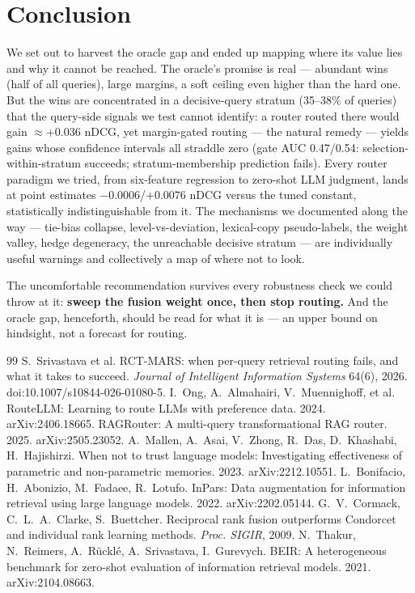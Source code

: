 \documentclass[11pt]{article}
\begin{document}
\section{Conclusion}
We set out to harvest the oracle gap and ended up mapping where its value lies and why it cannot be reached. The oracle's promise is real --- abundant wins (half of all queries), large margins, a soft ceiling even higher than the hard one. But the wins are concentrated in a decisive-query stratum (35--38\% of queries) that the query-side signals we test cannot identify: a router routed there would gain ${\approx}{+}0.036$ nDCG, yet margin-gated routing --- the natural remedy --- yields gains whose confidence intervals all straddle zero (gate AUC 0.47/0.54: selection-within-stratum succeeds; stratum-membership prediction fails). Every router paradigm we tried, from six-feature regression to zero-shot LLM judgment, lands at point estimates $-0.0006$/$+0.0076$ nDCG versus the tuned constant, statistically indistinguishable from it. The mechanisms we documented along the way --- tie-bias collapse, level-vs-deviation, lexical-copy pseudo-labels, the weight valley, hedge degeneracy, the unreachable decisive stratum --- are individually useful warnings and collectively a map of where not to look.

The uncomfortable recommendation survives every robustness check we could throw at it: \textbf{sweep the fusion weight once, then stop routing.} And the oracle gap, henceforth, should be read for what it is --- an upper bound on hindsight, not a forecast for routing.

\begin{thebibliography}{99}
 S.~Srivastava et al. RCT-MARS: when per-query retrieval routing fails, and what it takes to succeed. \emph{Journal of Intelligent Information Systems} 64(6), 2026. doi:10.1007/s10844-026-01080-5.
 I.~Ong, A.~Almahairi, V.~Muennighoff, et al. RouteLLM: Learning to route LLMs with preference data. 2024. arXiv:2406.18665.
 RAGRouter: A multi-query transformational RAG router. 2025. arXiv:2505.23052.
 A.~Mallen, A.~Asai, V.~Zhong, R.~Das, D.~Khashabi, H.~Hajishirzi. When not to trust language models: Investigating effectiveness of parametric and non-parametric memories. 2023. arXiv:2212.10551.
 L.~Bonifacio, H.~Abonizio, M.~Fadaee, R.~Lotufo. InPars: Data augmentation for information retrieval using large language models. 2022. arXiv:2202.05144.
 G.~V.~Cormack, C.~L.~A.~Clarke, S.~Buettcher. Reciprocal rank fusion outperforms Condorcet and individual rank learning methods. \emph{Proc. SIGIR}, 2009.
 N.~Thakur, N.~Reimers, A.~R\"uckl\'e, A.~Srivastava, I.~Gurevych. BEIR: A heterogeneous benchmark for zero-shot evaluation of information retrieval models. 2021. arXiv:2104.08663.
\end{thebibliography}
\end{document}
